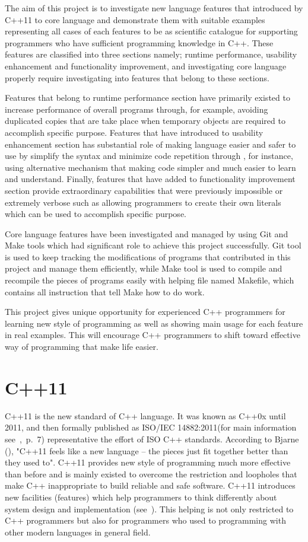 \documentclass[11pt]{report}
\begin{document}
The aim  of this project is to investigate new language features that introduced by C++11 to core language and demonstrate them with suitable examples representing all cases of each features to be as scientific catalogue for supporting programmers who have sufficient programming knowledge in C++. These features are classified into three sections namely; runtime performance, usability enhancement and functionality improvement, and investigating core language properly require investigating into features that belong to these sections.

Features that belong to runtime performance section have primarily existed to increase performance of overall programs through, for example, avoiding duplicated copies that are take place when temporary objects are required to accomplish specific purpose.  Features that have introduced to usability enhancement section has substantial role of making language easier and safer to use by simplify the syntax and minimize code repetition through , for instance, using alternative mechanism that making code simpler and  much easier to learn and understand.  Finally, features that have added to functionality improvement section provide extraordinary capabilities that were previously impossible or extremely verbose such as allowing programmers to create their own literals which can be used to accomplish specific purpose. 

Core language features have been investigated and managed by using Git and Make tools which had significant role to achieve this project successfully. Git tool is used to keep tracking the modifications of programs that contributed in this project and manage them efficiently, while Make tool is used to compile and recompile the pieces of programs easily with helping file named Makefile, which contains all instruction that tell Make how to do work. 

This project gives unique opportunity for experienced C++ programmers for learning new style of programming as well as showing main usage for each feature in real examples. This will encourage C++ programmers to shift toward effective way of programming that make life easier.

\section{C++11}
\label{sec: C++11}
C++11 is the new standard of C++ language. It was known as C++0x until 2011, and then formally published as ISO/IEC 14882:2011(for main information see~\cite{Josuttis:2012:CppStandard},~p.~7) representative the effort of ISO C++ standards.  According to Bjarne (\cite{Stroustrup:2012:Cpp11}), "C++11 feels like a new language -- the pieces just fit together better than they used to". C++11 provides new style of programming much more effective than before and is mainly existed to overcome the restriction and loopholes that make C++ inappropriate to build reliable and safe software.  C++11 introduces new facilities (features) which help programmers to think differently about system design and implementation (see~\cite{Stroustrup:2012:Cpp11}). This helping is not only restricted to C++ programmers but also for programmers who used to programming with other modern languages in general field. 
\end{document}
